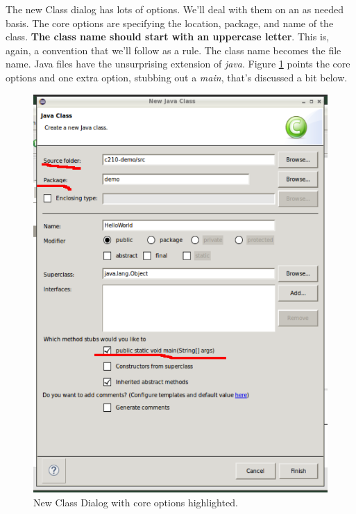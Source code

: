 \documentclass[]{tufte-handout}
\begin{document}
The new Class dialog has lots of options. We'll deal with them on an as needed basis. The core options are specifying the location, package, and name of the class. \textbf{The class name should start with an uppercase letter}. This is, again, a convention that we'll follow as a rule. The class name becomes the file name. Java files have the unsurprising extension of \textit{java}. Figure \ref{fig:newclass} points the core options and one extra option, stubbing out a \textit{main}, that's discussed a bit below.

\vspace{.1in}
\begin{center}
\begin{figure}[h]
\includegraphics[scale=.5]{Eclipse-NewClass.png}
\caption{New Class Dialog with core options highlighted.}
\label{fig:newclass} 
\end{figure}
\end{center}
\vspace{.1in}
\end{document}
